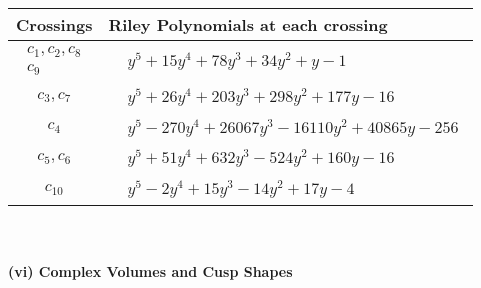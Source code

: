 \documentclass[1p]{elsarticle_modified}
\theoremstyle{definition}
\begin{document}
\begin{tabular}{m{50pt}|m{274pt}}
Crossings & \hspace{64pt}Riley Polynomials at each crossing \\
\hline $$\begin{aligned}c_{1},c_{2},c_{8}\\c_{9}\end{aligned}$$&$\begin{aligned}
&y^5+15 y^4+78 y^3+34 y^2+y-1
\end{aligned}$\\
\hline $$\begin{aligned}c_{3},c_{7}\end{aligned}$$&$\begin{aligned}
&y^5+26 y^4+203 y^3+298 y^2+177 y-16
\end{aligned}$\\
\hline $$\begin{aligned}c_{4}\end{aligned}$$&$\begin{aligned}
&y^5-270 y^4+26067 y^3-16110 y^2+40865 y-256
\end{aligned}$\\
\hline $$\begin{aligned}c_{5},c_{6}\end{aligned}$$&$\begin{aligned}
&y^5+51 y^4+632 y^3-524 y^2+160 y-16
\end{aligned}$\\
\hline $$\begin{aligned}c_{10}\end{aligned}$$&$\begin{aligned}
&y^5-2 y^4+15 y^3-14 y^2+17 y-4
\end{aligned}$\\
\hline
\end{tabular}\\~\\
\newpage\flushleft \textbf{(vi) Complex Volumes and Cusp Shapes}
\end{document}
